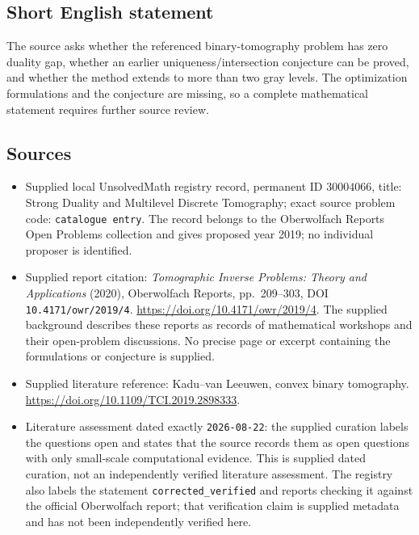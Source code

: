 \documentclass[11pt]{article}
\begin{document}
\subsection{Short English statement}
The source asks whether the referenced binary-tomography problem has zero duality gap, whether an earlier uniqueness/intersection conjecture can be proved, and whether the method extends to more than two gray levels. The optimization formulations and the conjecture are missing, so a complete mathematical statement requires further source review.
\subsection{Sources}
\begin{itemize}
\item Supplied local UnsolvedMath registry record, permanent ID \(30004066\), title: Strong Duality and Multilevel Discrete Tomography; exact source problem code: \texttt{catalogue entry}. The record belongs to the Oberwolfach Reports Open Problems collection and gives proposed year 2019; no individual proposer is identified.
\item Supplied report citation: \emph{Tomographic Inverse Problems: Theory and Applications} (2020), Oberwolfach Reports, pp.\ 209--303, DOI \texttt{10.4171/owr/2019/4}. \url{https://doi.org/10.4171/owr/2019/4}. The supplied background describes these reports as records of mathematical workshops and their open-problem discussions. No precise page or excerpt containing the formulations or conjecture is supplied.
\item Supplied literature reference: Kadu--van Leeuwen, convex binary tomography. \url{https://doi.org/10.1109/TCI.2019.2898333}.
\item Literature assessment dated exactly \texttt{2026-08-22}: the supplied curation labels the questions open and states that the source records them as open questions with only small-scale computational evidence. This is supplied dated curation, not an independently verified literature assessment. The registry also labels the statement \texttt{corrected\_verified} and reports checking it against the official Oberwolfach report; that verification claim is supplied metadata and has not been independently verified here.
\end{itemize}
\end{document}
